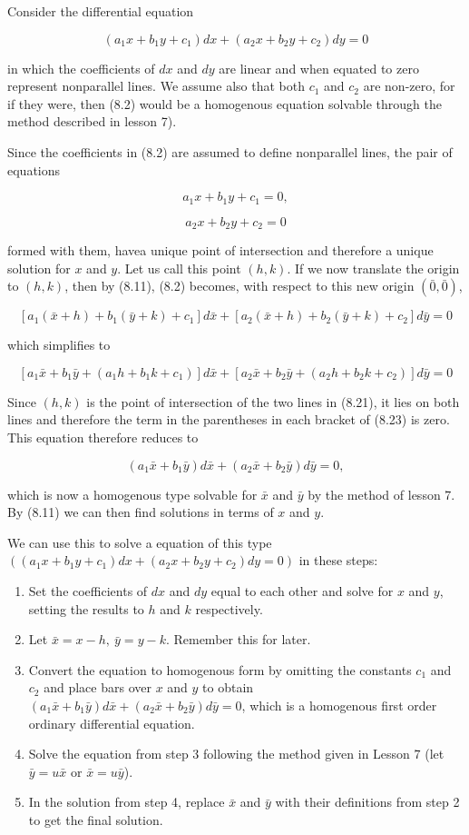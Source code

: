 \documentclass{article}
\begin{document}
Consider the differential equation

\[ (a_1x + b_1y + c_1)dx + (a_2x + b_2y + c_2)dy = 0 \tag{8.2} \]

in which the coefficients of $dx$ and $dy$ are linear and when equated to zero represent nonparallel lines. We assume also that both $c_1$ and $c_2$ are non-zero, for if they were, then (8.2) would be a homogenous equation solvable through the method described in lesson 7).

Since the coefficients in (8.2) are assumed to define nonparallel lines, the pair of equations

\[ a_1x + b_1y + c_1 = 0, \tag{8.21} \]

\[ a_2x + b_2y + c_2 = 0 \]

formed with them, havea unique point of intersection and therefore a unique solution for $x$ and $y$. Let us call this point $(h,k)$. If we now translate the origin to $(h,k)$, then by (8.11), (8.2) becomes, with respect to this new origin $(\bar{0},\bar{0})$,

\[ [a_1(\bar{x} + h) + b_1(\bar{y} + k) + c_1]d\bar{x} + [a_2(\bar{x} + h) + b_2(\bar{y} + k) + c_2]d\bar{y} = 0 \tag{8.23} \]

which simplifies to

\[ [a_1\bar{x} + b_1\bar{y} + (a_1h + b_1k + c_1)]d\bar{x} + [a_2\bar{x} + b_2\bar{y} + (a_2h + b_2k + c_2)]d\bar{y} = 0 \tag{8.23} \]

Since $(h,k)$ is the point of intersection of the two lines in (8.21), it lies on both lines and therefore the term in the parentheses in each bracket of (8.23) is zero. This equation therefore reduces to 

\[ (a_1\bar{x} + b_1\bar{y})d\bar{x} + (a_2\bar{x} + b_2\bar{y})d\bar{y} = 0, \tag{8.24} \]

which is now a homogenous type solvable for $\bar{x}$ and $\bar{y}$ by the method of lesson 7. By (8.11) we can then find solutions in terms of $x$ and $y$.

We can use this to solve a equation of this type $((a_1x + b_1y + c_1)dx + (a_2x + b_2y + c_2)dy = 0)$ in these steps:

\begin{enumerate}
\item Set the coefficients of $dx$ and $dy$ equal to each other and solve for $x$ and $y$, setting the results to $h$ and $k$ respectively.
\item Let $\bar{x} = x - h,~\bar{y} = y - k$. Remember this for later.
\item Convert the equation to homogenous form by omitting the constants $c_1$ and $c_2$ and place bars over $x$ and $y$ to obtain $(a_1\bar{x} + b_1\bar{y})d\bar{x} + (a_2\bar{x} + b_2\bar{y})d\bar{y} = 0$, which is a homogenous first order ordinary differential equation.
\item Solve the equation from step 3 following the method given in Lesson 7 (let $\bar{y} = u\bar{x}$ or $\bar{x} = u\bar{y}$).
\item In the solution from step 4, replace $\bar{x}$ and $\bar{y}$ with their definitions from step 2 to get the final solution.
\end{enumerate}
\end{document}
